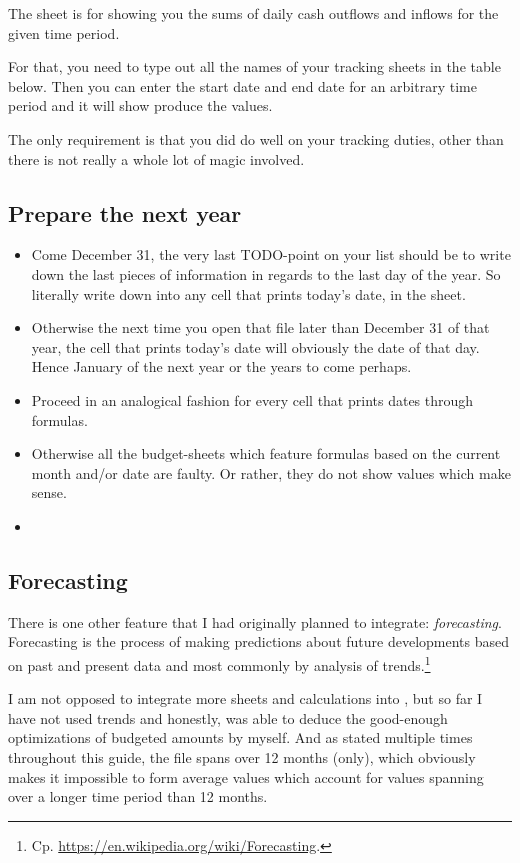 The sheet  is for showing you the sums of daily cash outflows and inflows for the given time period.

For that, you need to type out all the names of your tracking sheets in the table below.
Then you can enter the start date and end date for an arbitrary time period and it will show produce the values.

The only requirement is that you did do well on your tracking duties, other than there is not really a whole lot of magic involved.

\subsection{Prepare the next year}
\label{subsec:prepare-the-next-year}

\begin{itemize}
	\item Come December 31, the very last TODO-point on your list should be to write down the last pieces of information in regards to the last day of the year.
	So literally write down  into any cell that prints today's date, \eg in the  sheet.
	\item Otherwise the next time you open that file later than December 31 of that year, the cell that prints today's date will obviously the date of that day.
	Hence January of the next year or the years to come perhaps.
	\item Proceed in an analogical fashion for every cell that prints dates through formulas.
	\item Otherwise all the budget-sheets which feature formulas based on the current month and/or date are faulty.
	Or rather, they do not show values which make sense.
	\item 
\end{itemize}

\subsection{Forecasting}
\label{subsec:forecasting}

There is one other feature that I had originally planned to integrate: \emph{forecasting}.
Forecasting is the process of making predictions about future developments based on past and present data and most commonly by analysis of trends.\footnote{Cp. \href{https://en.wikipedia.org/wiki/Forecasting}{https://en.wikipedia.org/wiki/Forecasting}.}

I am not opposed to integrate more sheets and calculations into \tfn, but so far I have not used trends and honestly, was able to deduce the good-enough optimizations of budgeted amounts by myself.
And as stated multiple times throughout this guide, the file spans over 12 months (only), which obviously makes it impossible to form average values which account for values spanning over a longer time period than 12 months.